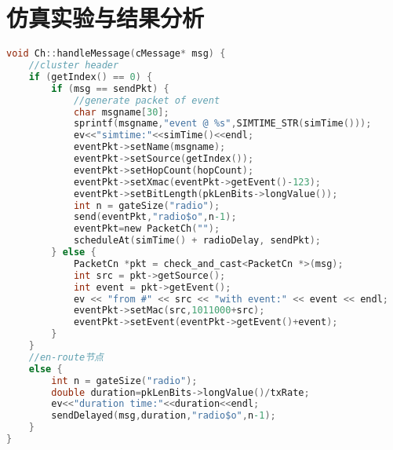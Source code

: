 \chapter{仿真实验与结果分析}
\begin{lstlisting}[language=C]
void Ch::handleMessage(cMessage* msg) {
    //cluster header
    if (getIndex() == 0) {
        if (msg == sendPkt) {
            //generate packet of event
            char msgname[30];
            sprintf(msgname,"event @ %s",SIMTIME_STR(simTime()));
            ev<<"simtime:"<<simTime()<<endl;
            eventPkt->setName(msgname);
            eventPkt->setSource(getIndex());
            eventPkt->setHopCount(hopCount);
            eventPkt->setXmac(eventPkt->getEvent()-123);
            eventPkt->setBitLength(pkLenBits->longValue());
            int n = gateSize("radio");
            send(eventPkt,"radio$o",n-1);
            eventPkt=new PacketCh("");
            scheduleAt(simTime() + radioDelay, sendPkt);
        } else {
            PacketCn *pkt = check_and_cast<PacketCn *>(msg);
            int src = pkt->getSource();
            int event = pkt->getEvent();
            ev << "from #" << src << "with event:" << event << endl;
            eventPkt->setMac(src,1011000+src);
            eventPkt->setEvent(eventPkt->getEvent()+event);
        }
    }
    //en-route节点
    else {
        int n = gateSize("radio");
        double duration=pkLenBits->longValue()/txRate;
        ev<<"duration time:"<<duration<<endl;
        sendDelayed(msg,duration,"radio$o",n-1);
    }
}
\end{lstlisting}

